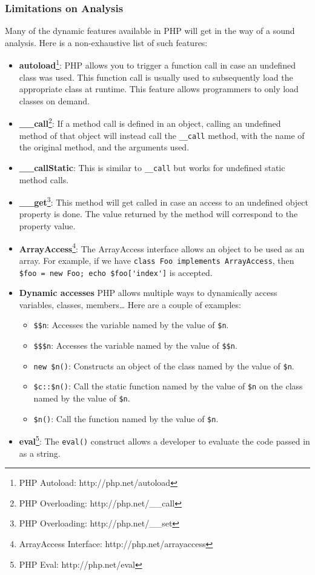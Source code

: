 \documentclass[a4paper]{article}
\begin{document}
\subsubsection{Limitations on Analysis}
Many of the dynamic features available in PHP will get in the way of a sound
analysis.  Here is a non-exhaustive list of such features:
\begin{itemize}
  \item \textbf{autoload}\footnote{PHP Autoload: http://php.net/autoload}:
    PHP allows you to trigger a function call in case an undefined class was
    used.  This function call is usually used to subsequently load the
    appropriate class at runtime. This feature allows programmers to only load
    classes on demand.
  \item \textbf{\_\_call}\footnote{PHP Overloading: http://php.net/\_\_call}:
    If a method call is defined in an object, calling an undefined method of
    that object will instead call the \verb&__call& method, with the name of
    the original method, and the arguments used.
  \item \textbf{\_\_callStatic}:
    This is similar to \verb&__call& but works for undefined static method
    calls.
  \item \textbf{\_\_get}\footnote{PHP Overloading: http://php.net/\_\_set}:
    This method will get called in case an access to an undefined object
    property is done. The value returned by the method will correspond to the
    property value.
  \item \textbf{ArrayAccess}\footnote{ArrayAccess Interface: http://php.net/arrayaccess}:
    The ArrayAccess interface allows an object to be used as an array. For
    example, if we have \verb&class Foo implements ArrayAccess&, then
    \verb&$foo = new Foo; echo $foo['index']& is accepted.
  \item \textbf{Dynamic accesses}
    PHP allows multiple ways to dynamically access variables, classes, members\ldots
    Here are a couple of examples:
    \begin{itemize}
      \item \verb/$$n/:
        Accesses the variable named by the value of \verb/$n/.
      \item \verb/$$$n/:
        Accesses the variable named by the value of \verb/$$n/.
      \item \verb/new $n()/:
        Constructs an object of the class named by the value of \verb/$n/.
      \item \verb/$c::$n()/:
        Call the static function named by the value of \verb/$n/ on the class
        named by the value of \verb/$n/.
      \item \verb/$n()/:
        Call the function named by the value of \verb/$n/.
    \end{itemize}
  \item \textbf{eval}\footnote{PHP Eval: http://php.net/eval}:
    The \verb&eval()& construct allows a developer to evaluate the code passed
    in as a string.
\end{itemize}
\end{document}
